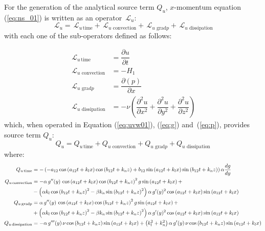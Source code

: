 \documentclass[10pt]{article}
\newcommand{\Diff}[2] {\dfrac{\partial( #1)}{\partial #2}}
\newcommand{\diff}[2] {\dfrac{\partial #1}{\partial #2}}
\newcommand{\Lo}{\,\mathcal{L}}
\newcommand{\convection}{\,\text{convection}}
\newcommand{\gradp}{\,\text{grad}p}
\newcommand{\dissipation}{\,\text{dissipation}}
\begin{document}

For the generation of the analytical source term $Q_u$, $x$-momentum equation (\ref{eq:ns_01}) is written as an operator $\Lo_u$:
 $$\Lo_u = \Lo_{u \, \text{time}}+\Lo_{u \, \convection}+\Lo_{u \, \gradp }+\Lo_{u \, \dissipation }$$
with each one of the sub-operators defined as follows:

\begin{equation}
 \begin{split}
\Lo_{u \, \text{time}}&= \diff{u}{t}  \\
\Lo_{u \, \convection}&= -H_1\\
\Lo_{u \, \gradp }&= \Diff{p}{x}\\
\Lo_{u \, \dissipation }&= - \nu\left(\diff{^2 u}{ x^2}+\diff{^2 u}{ y^2}+\diff{^2 u}{ z^2} \right)
 \end{split}
\end{equation}
%
which, when operated in Equation (\ref{eq:uvw01}),  (\ref{eq:g}) and~(\ref{eq:p}), provides source term $Q_{u}$:
\begin{equation*} 
Q_u = Q_{u \, \text{time}}+Q_{u \, \convection}+Q_{u \, \gradp }+Q_{u \, \dissipation }
\end{equation*}
where:
\begin{equation*}
\begin{split}
Q_{u \,\text{time}} &=-\left(-a_{12} \cos\left(a_{12} t+k_l x\right) \cos\left(b_{12} t+k_n z\right)+b_{12} \sin\left(a_{12} t+k_l x\right) \sin\left(b_{12} t+k_n z\right)\right) \alpha \frac{dg}{dy}\\
%
 Q_{u \convection} &= -\alpha \, g''(y) \, \cos\left(a_{12} t+k_l x\right) \cos\left(b_{12} t+k_n z\right)^2 g \sin\left(a_{12} t+k_l x\right)+\\
	&- \left(\alpha k_l \cos\left(b_{12} t+k_n z\right)^2-\beta k_n \sin\left(b_{12} t+k_n z\right)^2\right) \alpha \, g'(y)^2 \cos\left(a_{12} t+k_l x\right) \sin\left(a_{12} t+k_l x\right) \\
%
Q_{u \gradp} &=\alpha \, g''(y) \, \cos\left(a_{12} t+k_l x\right) \cos\left(b_{12} t+k_n z\right)^2 g \sin\left(a_{12} t+k_l x\right)+\\
	&+\left(\alpha k_l \cos\left(b_{12} t+k_n z\right)^2-\beta k_n \sin\left(b_{12} t+k_n z\right)^2\right) \alpha \, g'(y)^2 \cos\left(a_{12} t+k_l x\right) \sin\left(a_{12} t+k_l x\right) \\
%
 Q_{u \dissipation} &=-\alpha\, g'''(y) \, \nu \cos\left(b_{12} t+k_n z\right) \sin\left(a_{12} t+k_l x\right)+\left(k_l^2+k_n^2\right) \alpha \, g'(y) \,\nu \cos\left(b_{12} t+k_n z\right) \sin\left(a_{12} t+k_l x\right)\\\vspace{8pt}
\end{split}
\end{equation*}
\end{document}
